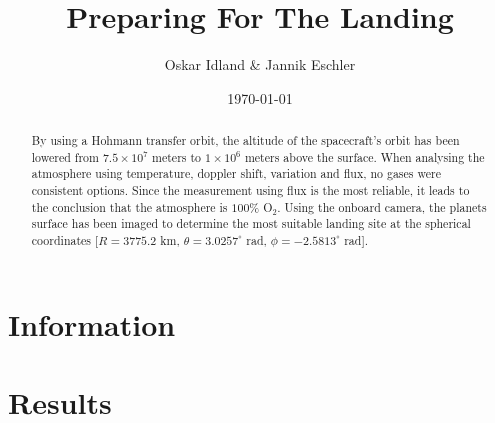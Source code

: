 \documentclass[reprint,english,notitlepage]{revtex4-2}
\begin{document}
\title{Preparing For The Landing}
\author{Oskar Idland \& Jannik Eschler}
\date{\today}

\begin{abstract}
    By using a Hohmann transfer orbit, the altitude of the spacecraft's orbit has been lowered from $7.5 \times 10^7$ meters to $1 \times 10^6$ meters above the surface.
    When analysing the atmosphere using temperature, doppler shift, variation and flux, no gases were consistent options.
    Since the measurement using flux is the most reliable, it leads to the conclusion that the atmosphere is $100\%$ O$_2$.
    Using the onboard camera, the planets surface has been imaged to determine the most suitable landing site at the spherical coordinates [$R = 3775.2$ km, $\theta = 3.0257^{\circ}$ rad, $\phi = -2.5813^{\circ}$ rad].
\end{abstract}

\maketitle
\onecolumngrid
\section{Information} \label{sec:info}

\section{Results} \label{sec: results}
\end{document}
